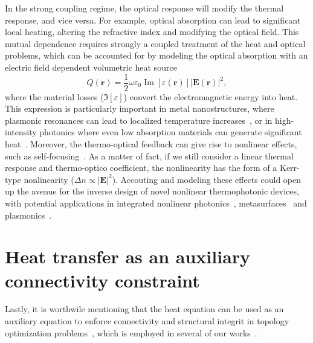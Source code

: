 In the strong coupling regime, the optical response will modify the thermal response, and vice versa.
For example, optical absorption can lead to significant local heating, altering the refractive index and modifying the optical field. 
This mutual dependence requires strongly a coupled treatment of the heat and optical problems, 
which can be accounted for by modeling the optical absorption with an electric field dependent volumetric heat source~\cite{plasm_heat_source}
\[
Q(\mathbf{r}) = \frac{1}{2} \omega \varepsilon_0 \operatorname{Im}[\varepsilon(\mathbf{r})] |\mathbf{E}(\mathbf{r})|^2,
\]
where the material losses ($\Im[\varepsilon]$) convert the electromagnetic energy into heat. 
This expression is particularly important in metal nanostructures, where plasmonic resonances can lead to localized temperature increases~\cite{plasm_heat_source}, or in 
high-intensity photonics where even low absorption materials can generate significant heat~\cite{thermal_nl, high_I_T}. Moreover, the thermo-optical feedback can give rise to nonlinear effects, such as self-focusing~\cite{thermal_nl}. As a matter of fact, if we still consider a linear
thermal response and thermo-optico coefficient,
the nonlinearity has the form of a Kerr-type nonlinearity ($\Delta n \propto \vert \mathbf{E} \vert^2$). Accouting and modeling
these effects could open up the avenue for the inverse design of novel nonlinear thermophotonic devices, with potential applications
in integrated nonlinear photonics~\cite{nl_photonics}, metasurfaces~\cite{nl_meta} and plasmonics~\cite{novotny}.


\section{Heat transfer as an auxiliary connectivity constraint}

Lastly, it is worthwile mentioning that the heat equation can be used as an auxiliary equation to enforce connectivity
and structural integrit in topology optimization problems~\cite{vanessa, structural_heat}, which is employed in several of our
works~\cite{ownpub1,ownpub2}. 

